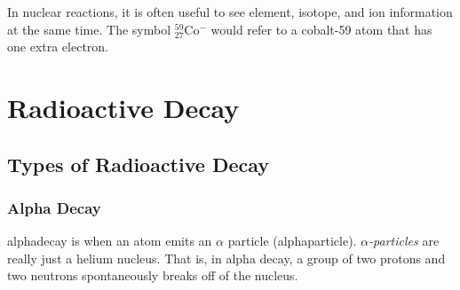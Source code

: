 In nuclear reactions, it is often useful to see element, isotope, and ion information at the same time.  The symbol $^{59}_{27}$Co$^{-}$ would refer to a cobalt-59 atom that has one extra electron.  









\section{Radioactive Decay}

\subsection{Types of Radioactive Decay}
\subsubsection{Alpha Decay}
\gls{alphadecay} is when an atom emits an  $\alpha$ particle  (\gls{alphaparticle}).  \textit{$\alpha$-particles} are really just a helium nucleus.  That is, in alpha decay, a group of two protons and two neutrons spontaneously breaks off of the nucleus.  

